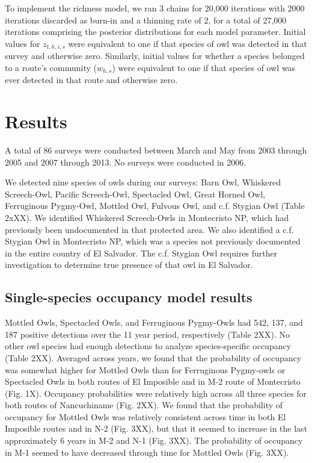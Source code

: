 \documentclass[
]{article}
\begin{document}
To implement the richness model, we ran 3 chains for 20,000 iterations
with 2000 iterations discarded as burn-in and a thinning rate of 2, for
a total of 27,000 iterations comprising the posterior distributions for
each model parameter. Initial values for \(z_{t,h,i,s}\) were equivalent
to one if that species of owl was detected in that survey and otherwise
zero. Similarly, initial values for whether a species belonged to a
route's community (\(w_{h,s}\)) were equivalent to one if that species
of owl was ever detected in that route and otherwise zero.

\hypertarget{results}{%
\section{Results}\label{results}}

A total of 86 surveys were conducted between March and May from 2003
through 2005 and 2007 through 2013. No surveys were conducted in 2006.

We detected nine species of owls during our surveys: Barn Owl, Whiskered
Screech-Owl, Pacific Screech-Owl, Spectacled Owl, Great Horned Owl,
Ferruginous Pygmy-Owl, Mottled Owl, Fulvous Owl, and c.f. Stygian Owl
(Table 2xXX). We identified Whiskered Screech-Owls in Montecristo NP,
which had previously been undocumented in that protected area. We also
identified a c.f. Stygian Owl in Montecristo NP, which was a species not
previously documented in the entire country of El Salvador. The c.f.
Stygian Owl requires further investigation to determine true presence of
that owl in El Salvador.

\hypertarget{single-species-occupancy-model-results}{%
\subsection{Single-species occupancy model
results}\label{single-species-occupancy-model-results}}

Mottled Owls, Spectacled Owls, and Ferruginous Pygmy-Owls had 542, 137,
and 187 positive detections over the 11 year period, respectively (Table
2XX). No other owl species had enough detections to analyze
species-specific occupancy (Table 2XX). Averaged across years, we found
that the probability of occupancy was somewhat higher for Mottled Owls
than for Ferruginous Pygmy-owls or Spectacled Owls in both routes of El
Imposible and in M-2 route of Montecristo (Fig. 1X). Occupancy
probabilities were relatively high across all three species for both
routes of Nancuchiname (Fig. 2XX). We found that the probability of
occupancy for Mottled Owls was relatively consistent across time in both
El Imposible routes and in N-2 (Fig. 3XX), but that it seemed to
increase in the last approximately 6 years in M-2 and N-1 (Fig. 3XX).
The probability of occupancy in M-1 seemed to have decreased through
time for Mottled Owls (Fig. 3XX).
\end{document}

